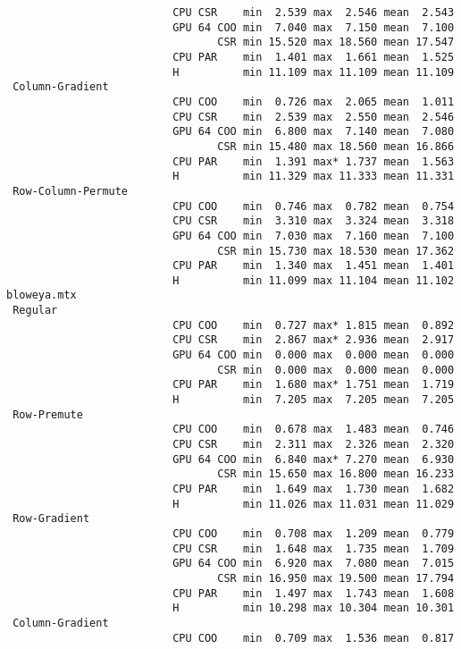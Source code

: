\begin{verbatim}
                          CPU CSR    min  2.539 max  2.546 mean  2.543
                          GPU 64 COO min  7.040 max  7.150 mean  7.100
                                 CSR min 15.520 max 18.560 mean 17.547
                          CPU PAR    min  1.401 max  1.661 mean  1.525
                          H          min 11.109 max 11.109 mean 11.109
 Column-Gradient
                          CPU COO    min  0.726 max  2.065 mean  1.011
                          CPU CSR    min  2.539 max  2.550 mean  2.546
                          GPU 64 COO min  6.800 max  7.140 mean  7.080
                                 CSR min 15.480 max 18.560 mean 16.866
                          CPU PAR    min  1.391 max* 1.737 mean  1.563
                          H          min 11.329 max 11.333 mean 11.331
 Row-Column-Permute
                          CPU COO    min  0.746 max  0.782 mean  0.754
                          CPU CSR    min  3.310 max  3.324 mean  3.318
                          GPU 64 COO min  7.030 max  7.160 mean  7.100
                                 CSR min 15.730 max 18.530 mean 17.362
                          CPU PAR    min  1.340 max  1.451 mean  1.401
                          H          min 11.099 max 11.104 mean 11.102
bloweya.mtx
 Regular
                          CPU COO    min  0.727 max* 1.815 mean  0.892
                          CPU CSR    min  2.867 max* 2.936 mean  2.917
                          GPU 64 COO min  0.000 max  0.000 mean  0.000
                                 CSR min  0.000 max  0.000 mean  0.000
                          CPU PAR    min  1.680 max* 1.751 mean  1.719
                          H          min  7.205 max  7.205 mean  7.205
 Row-Premute
                          CPU COO    min  0.678 max  1.483 mean  0.746
                          CPU CSR    min  2.311 max  2.326 mean  2.320
                          GPU 64 COO min  6.840 max* 7.270 mean  6.930
                                 CSR min 15.650 max 16.800 mean 16.233
                          CPU PAR    min  1.649 max  1.730 mean  1.682
                          H          min 11.026 max 11.031 mean 11.029
 Row-Gradient
                          CPU COO    min  0.708 max  1.209 mean  0.779
                          CPU CSR    min  1.648 max  1.735 mean  1.709
                          GPU 64 COO min  6.920 max  7.080 mean  7.015
                                 CSR min 16.950 max 19.500 mean 17.794
                          CPU PAR    min  1.497 max  1.743 mean  1.608
                          H          min 10.298 max 10.304 mean 10.301
 Column-Gradient
                          CPU COO    min  0.709 max  1.536 mean  0.817

\end{verbatim}
